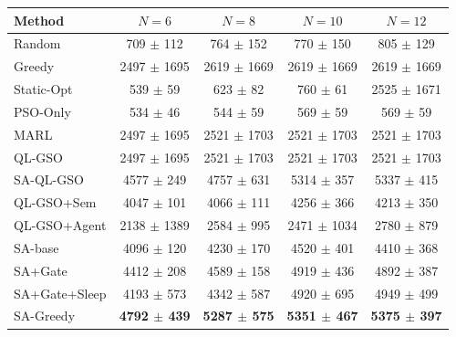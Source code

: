 \begin{tabular}{lcccc}
\toprule
Method & $N=6$ & $N=8$ & $N=10$ & $N=12$ \\
\midrule
Random & 709 $\pm$ 112 & 764 $\pm$ 152 & 770 $\pm$ 150 & 805 $\pm$ 129 \\
Greedy & 2497 $\pm$ 1695 & 2619 $\pm$ 1669 & 2619 $\pm$ 1669 & 2619 $\pm$ 1669 \\
Static-Opt & 539 $\pm$ 59 & 623 $\pm$ 82 & 760 $\pm$ 61 & 2525 $\pm$ 1671 \\
PSO-Only & 534 $\pm$ 46 & 544 $\pm$ 59 & 569 $\pm$ 59 & 569 $\pm$ 59 \\
MARL & 2497 $\pm$ 1695 & 2521 $\pm$ 1703 & 2521 $\pm$ 1703 & 2521 $\pm$ 1703 \\
QL-GSO & 2497 $\pm$ 1695 & 2521 $\pm$ 1703 & 2521 $\pm$ 1703 & 2521 $\pm$ 1703 \\
SA-QL-GSO & 4577 $\pm$ 249 & 4757 $\pm$ 631 & 5314 $\pm$ 357 & 5337 $\pm$ 415 \\
QL-GSO+Sem & 4047 $\pm$ 101 & 4066 $\pm$ 111 & 4256 $\pm$ 366 & 4213 $\pm$ 350 \\
QL-GSO+Agent & 2138 $\pm$ 1389 & 2584 $\pm$ 995 & 2471 $\pm$ 1034 & 2780 $\pm$ 879 \\
SA-base & 4096 $\pm$ 120 & 4230 $\pm$ 170 & 4520 $\pm$ 401 & 4410 $\pm$ 368 \\
SA+Gate & 4412 $\pm$ 208 & 4589 $\pm$ 158 & 4919 $\pm$ 436 & 4892 $\pm$ 387 \\
SA+Gate+Sleep & 4193 $\pm$ 573 & 4342 $\pm$ 587 & 4920 $\pm$ 695 & 4949 $\pm$ 499 \\
SA-Greedy & \textbf{4792 $\pm$ 439} & \textbf{5287 $\pm$ 575} & \textbf{5351 $\pm$ 467} & \textbf{5375 $\pm$ 397} \\
\bottomrule
\end{tabular}
